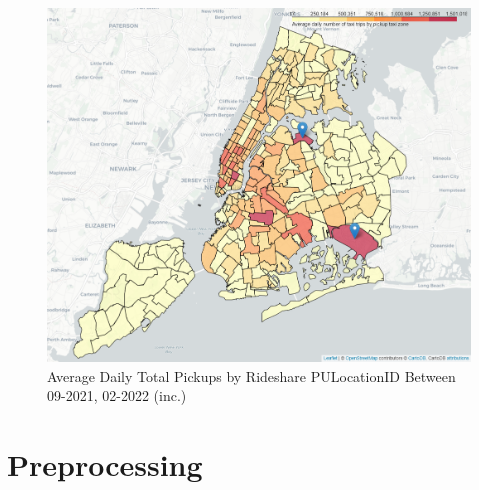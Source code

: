\documentclass[11pt]{article}
\begin{document}
\begin{figure}[h]
    \centering
    \includegraphics[width=12cm]{plots/Average_Taxi_Demand_Per_Day.PNG}
    \caption{Average Daily Total Pickups by Rideshare PULocationID Between 09-2021, 02-2022 (inc.) } %
\end{figure}

\section{Preprocessing}
\end{document}

